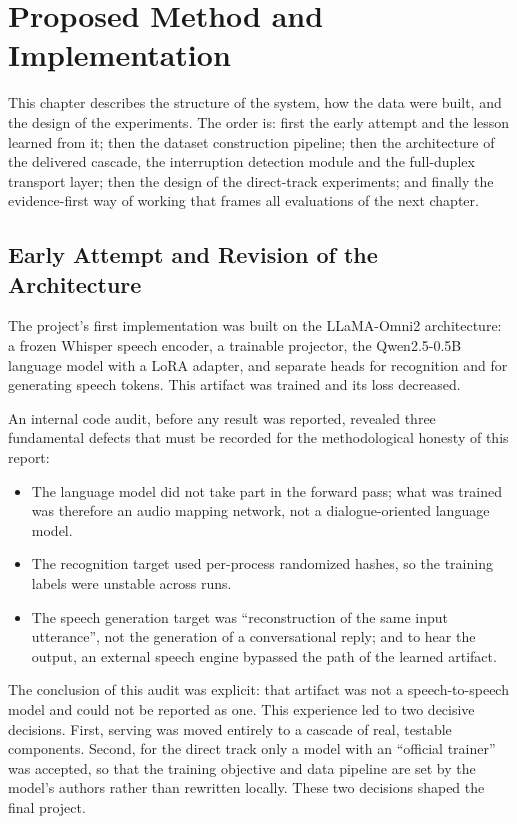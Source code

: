 \chapter{Proposed Method and Implementation}
\label{ch:method}

This chapter describes the structure of the system, how the data were built, and
the design of the experiments. The order is: first the early attempt and the lesson
learned from it; then the dataset construction pipeline; then the architecture of
the delivered cascade, the interruption detection module and the full-duplex
transport layer; then the design of the direct-track experiments; and finally the
evidence-first way of working that frames all evaluations of the next chapter.

\section{Early Attempt and Revision of the Architecture}
\label{sec:early-attempt}

The project's first implementation was built on the LLaMA-Omni2 architecture: a
frozen Whisper speech encoder, a trainable projector, the
Qwen2.5-0.5B~\cite{qwen2025qwen25} language model with a LoRA adapter, and separate
heads for recognition and for generating speech tokens. This artifact was trained
and its loss decreased.

An internal code audit, before any result was reported, revealed three fundamental
defects that must be recorded for the methodological honesty of this report:

\begin{itemize}
\item The language model did not take part in the forward pass; what was trained was
      therefore an audio mapping network, not a dialogue-oriented language model.
\item The recognition target used per-process randomized hashes, so the training
      labels were unstable across runs.
\item The speech generation target was ``reconstruction of the same input
      utterance'', not the generation of a conversational reply; and to hear the
      output, an external speech engine bypassed the path of the learned artifact.
\end{itemize}

The conclusion of this audit was explicit: that artifact was not a speech-to-speech
model and could not be reported as one. This experience led to two decisive
decisions. First, serving was moved entirely to a cascade of real, testable
components. Second, for the direct track only a model with an ``official trainer''
was accepted, so that the training objective and data pipeline are set by the
model's authors rather than rewritten locally. These two decisions shaped the final
project.

